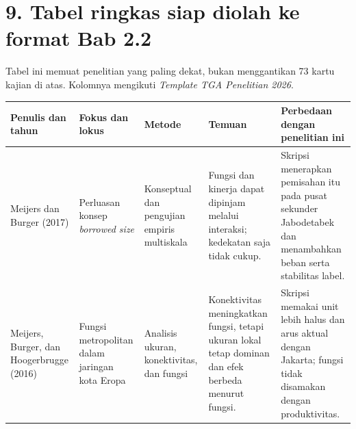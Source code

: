 \documentclass[
  indonesian,
  11pt,
  a4paper,
  oneside,
  openany]{report}
\newcounter{none} %
\begin{document}
\section{9. Tabel ringkas siap diolah ke format Bab
2.2}\label{tabel-ringkas-siap-diolah-ke-format-bab-2.2}

Tabel ini memuat penelitian yang paling dekat, bukan menggantikan 73
kartu kajian di atas. Kolomnya mengikuti \emph{Template TGA Penelitian
2026}.

{\def\LTcaptype{none} %
\begin{longtable}[]{@{}
  >{\raggedright\arraybackslash}p{}
  >{\raggedright\arraybackslash}p{}
  >{\raggedright\arraybackslash}p{}
  >{\raggedright\arraybackslash}p{}
  >{\raggedright\arraybackslash}p{}@{}}
\toprule\noalign{}
\begin{minipage}[b]{\linewidth}\raggedright
Penulis dan tahun
\end{minipage} & \begin{minipage}[b]{\linewidth}\raggedright
Fokus dan lokus
\end{minipage} & \begin{minipage}[b]{\linewidth}\raggedright
Metode
\end{minipage} & \begin{minipage}[b]{\linewidth}\raggedright
Temuan
\end{minipage} & \begin{minipage}[b]{\linewidth}\raggedright
Perbedaan dengan penelitian ini
\end{minipage} \\
\midrule\noalign{}
\endhead
\bottomrule\noalign{}
\endlastfoot
Meijers dan Burger (2017) & Perluasan konsep \emph{borrowed size} &
Konseptual dan pengujian empiris multiskala & Fungsi dan kinerja dapat
dipinjam melalui interaksi; kedekatan saja tidak cukup. & Skripsi
menerapkan pemisahan itu pada pusat sekunder Jabodetabek dan menambahkan
beban serta stabilitas label. \\
Meijers, Burger, dan Hoogerbrugge (2016) & Fungsi metropolitan dalam
jaringan kota Eropa & Analisis ukuran, konektivitas, dan fungsi &
Konektivitas meningkatkan fungsi, tetapi ukuran lokal tetap dominan dan
efek berbeda menurut fungsi. & Skripsi memakai unit lebih halus dan arus
aktual dengan Jakarta; fungsi tidak disamakan dengan produktivitas. \\

\end{longtable}}
\end{document}
